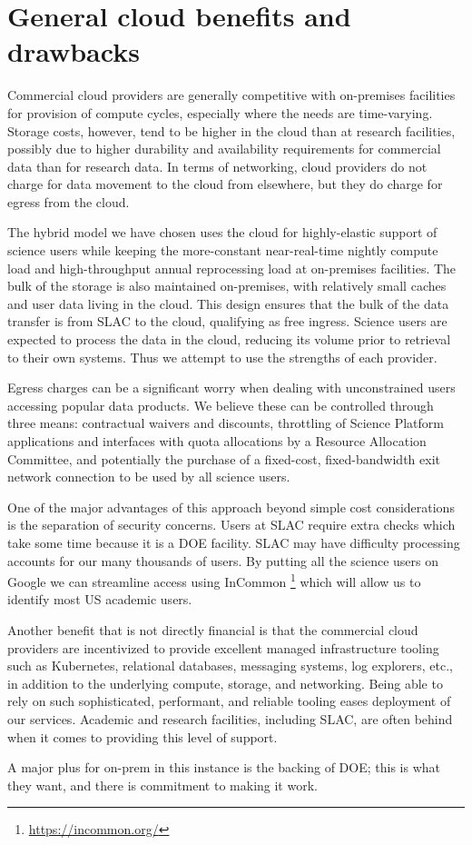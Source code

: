 \section{General cloud benefits and drawbacks} \label{sec:tradeoffs}

Commercial cloud providers are generally competitive with on-premises facilities for provision of compute cycles, especially where the needs are time-varying.
Storage costs, however, tend to be higher in the cloud than at research facilities, possibly due to higher durability and availability requirements for commercial data than for research data.
In terms of networking, cloud providers do not charge for data movement to the cloud from elsewhere, but they do charge for egress from the cloud.

The hybrid model we have chosen uses the cloud for highly-elastic support of science users while keeping the more-constant near-real-time nightly compute load and high-throughput annual reprocessing load at on-premises facilities.
The bulk of the storage is also maintained on-premises, with relatively small caches and user data living in the cloud.
This design ensures that the bulk of the data transfer is from SLAC to the cloud, qualifying as free ingress.
Science users are expected to process the data in the cloud, reducing its volume prior to retrieval to their own systems.
Thus we attempt to use the strengths of each provider.

Egress charges can be a significant worry when dealing with unconstrained users accessing popular data products.
We believe these can be controlled through three means: contractual waivers and discounts, throttling of Science Platform applications and interfaces with quota allocations by a Resource Allocation Committee, and potentially the purchase of a fixed-cost, fixed-bandwidth exit network connection to be used by all science users.

One of the major advantages of this approach beyond simple cost considerations is the separation of security concerns.
Users at SLAC require extra checks which take some time because it is a DOE facility.
SLAC may have difficulty processing accounts for our many thousands of users.
By putting all the science users on Google we can streamline access using InCommon \footnote{\url{https://incommon.org/}} which will allow us to identify most US academic users.

Another benefit that is not directly financial is that the commercial cloud providers are incentivized to provide excellent managed infrastructure tooling such as Kubernetes, relational databases, messaging systems, log explorers, etc., in addition to the underlying compute, storage, and networking.
Being able to rely on such sophisticated, performant, and reliable tooling eases deployment of our services.
Academic and research facilities, including SLAC, are often behind when it comes to providing this level of support.

A major plus for on-prem in this instance is the backing of DOE; this is what they want, and there is commitment to making it work.
